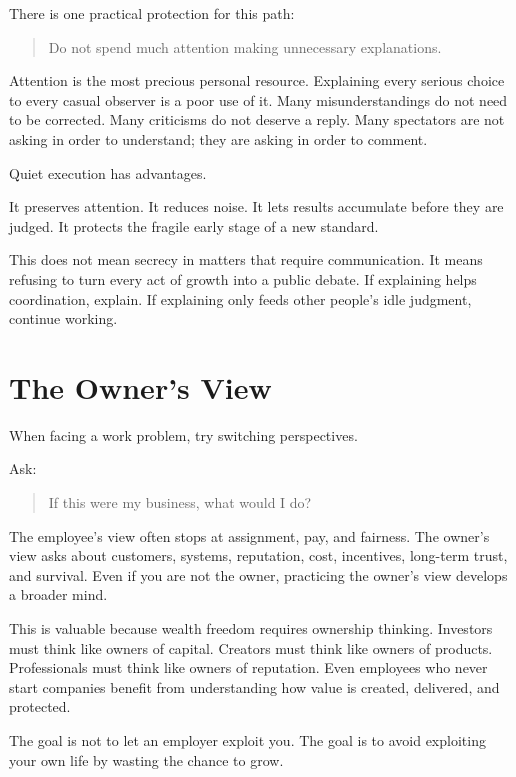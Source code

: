 There is one practical protection for this path:

\begin{quote}
Do not spend much attention making unnecessary explanations.
\end{quote}

Attention is the most precious personal resource. Explaining every serious choice to every casual observer is a poor use of it. Many misunderstandings do not need to be corrected. Many criticisms do not deserve a reply. Many spectators are not asking in order to understand; they are asking in order to comment.

Quiet execution has advantages.

It preserves attention. It reduces noise. It lets results accumulate before they are judged. It protects the fragile early stage of a new standard.

This does not mean secrecy in matters that require communication. It means refusing to turn every act of growth into a public debate. If explaining helps coordination, explain. If explaining only feeds other people's idle judgment, continue working.

\section*{The Owner's View}

When facing a work problem, try switching perspectives.

Ask:

\begin{quote}
If this were my business, what would I do?
\end{quote}

The employee's view often stops at assignment, pay, and fairness. The owner's view asks about customers, systems, reputation, cost, incentives, long-term trust, and survival. Even if you are not the owner, practicing the owner's view develops a broader mind.

This is valuable because wealth freedom requires ownership thinking. Investors must think like owners of capital. Creators must think like owners of products. Professionals must think like owners of reputation. Even employees who never start companies benefit from understanding how value is created, delivered, and protected.

The goal is not to let an employer exploit you. The goal is to avoid exploiting your own life by wasting the chance to grow.

